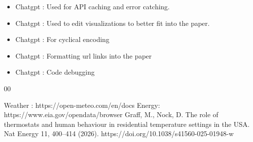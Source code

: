 \documentclass[11pt,a4paper]{article}
\begin{document}
\begin{itemize}[leftmargin=18pt]
    \item Chatgpt : Used for API caching and error catching.
    \item Chatgpt : Used to edit visualizations to better fit into the paper.
    \item Chatgpt : For cyclical encoding
    \item Chatgpt : Formatting url links into the paper
    \item Chatgpt : Code debugging
\end{itemize}

\begin{thebibliography}{00}

 Weather : https://open-meteo.com/en/docs
 Energy: https://www.eia.gov/opendata/browser
 Graff, M., Nock, D. The role of thermostats and human behaviour in residential temperature settings in the USA. Nat Energy 11, 400–414 (2026). https://doi.org/10.1038/s41560-025-01948-w
\end{thebibliography}
\end{document}
